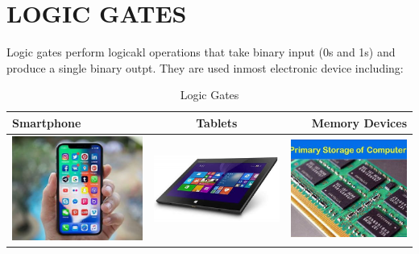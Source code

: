 \documentclass{article}
\begin{document}
	\section{LOGIC GATES}
	Logic gates perform logicakl operations that take binary input (0s and 1s) and produce a single binary outpt. They are used inmost electronic device including:
	\begin{table}[h!]
		\begin{center}
			\caption{Logic Gates}
			\label{tab:Table 1}
		\begin{tabular}{|l|c|r|}
			\hline
			Smartphone & Tablets & Memory Devices\\
			\hline
			\includegraphics[width=0.2\linewidth]{smartphone} & \includegraphics[width=0.2\linewidth]{tablet} & \includegraphics[width=0.2\linewidth]{memory devices}\\
			\hline
			
		\end{tabular}
		\end{center}
	\end{table}
\end{document}
